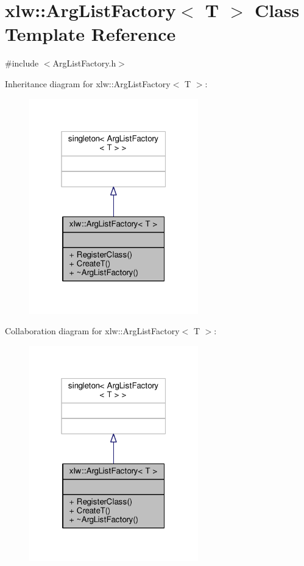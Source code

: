 \hypertarget{classxlw_1_1ArgListFactory}{}\section{xlw\+:\+:Arg\+List\+Factory$<$ T $>$ Class Template Reference}
\label{classxlw_1_1ArgListFactory}


{\ttfamily \#include $<$Arg\+List\+Factory.\+h$>$}



Inheritance diagram for xlw\+:\+:Arg\+List\+Factory$<$ T $>$\+:
\nopagebreak
\begin{figure}[H]
\begin{center}
\leavevmode
\includegraphics[width=208pt]{classxlw_1_1ArgListFactory__inherit__graph}
\end{center}
\end{figure}


Collaboration diagram for xlw\+:\+:Arg\+List\+Factory$<$ T $>$\+:
\nopagebreak
\begin{figure}[H]
\begin{center}
\leavevmode
\includegraphics[width=208pt]{classxlw_1_1ArgListFactory__coll__graph}
\end{center}
\end{figure}

